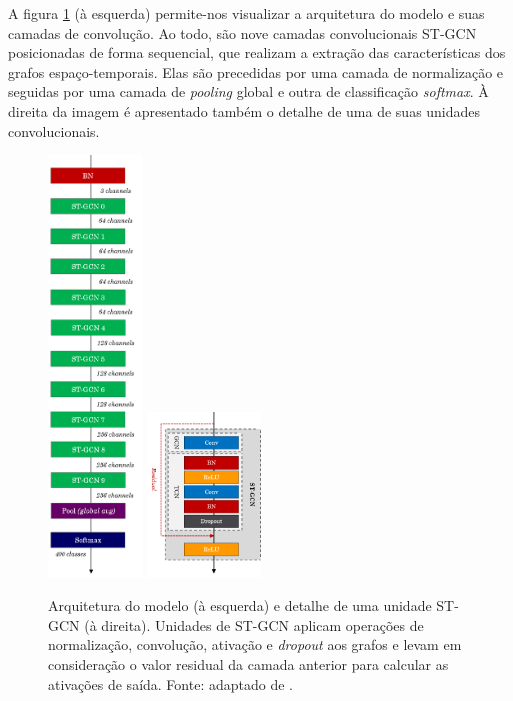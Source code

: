 
A figura \ref{fig:st-gcn-architecture} (à esquerda) permite-nos visualizar a arquitetura do modelo e suas camadas de convolução. Ao todo, são nove camadas convolucionais ST-GCN posicionadas de forma sequencial, que realizam a extração das características dos grafos espaço-temporais. Elas são precedidas por uma camada de normalização e seguidas por uma camada de \textit{pooling} global e outra de classificação \textit{softmax}. À direita da imagem é apresentado também o detalhe de uma de suas unidades convolucionais.

\begin{figure}[ht]
    \centering
    \includegraphics[width=2.5cm]{images/st_gcn_architecture}
    \includegraphics[width=3.0cm]{images/st_gcn_architeture_unit}
    \caption{Arquitetura do modelo (à esquerda) e detalhe de uma unidade ST-GCN (à direita). Unidades de ST-GCN aplicam operações de normalização, convolução, ativação e \textit{dropout} aos grafos e levam em consideração o valor residual da camada anterior para calcular as ativações de saída. Fonte: adaptado de \cite{st-gcn-2018}.}
    \label{fig:st-gcn-architecture}
\end{figure}


